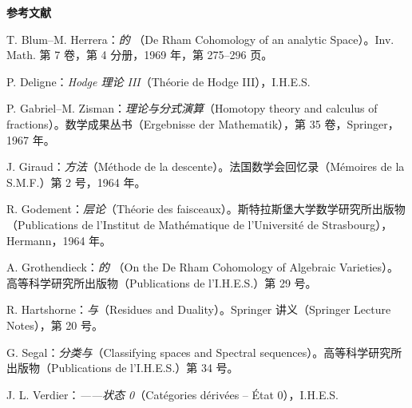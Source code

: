 \textbf{参考文献}
\begin{enumerate}[label={[\arabic*]}]
\item T. Blum--M. Herrera：\emph{的 }（De Rham Cohomology of an analytic Space）。Inv. Math. 第 7 卷，第 4 分册，1969 年，第 275--296 页。
\item P. Deligne：\emph{Hodge 理论 III}（Théorie de Hodge III），I.H.E.S.
\item P. Gabriel--M. Zisman：\emph{理论与分式演算}（Homotopy theory and calculus of fractions）。数学成果丛书（Ergebnisse der Mathematik），第 35 卷，Springer，1967 年。
\item J. Giraud：\emph{方法}（Méthode de la descente）。法国数学会回忆录（Mémoires de la S.M.F.）第 2 号，1964 年。
\item R. Godement：\emph{层论}（Théorie des faisceaux）。斯特拉斯堡大学数学研究所出版物（Publications de l'Institut de Mathématique de l'Université de Strasbourg），Hermann，1964 年。
\item A. Grothendieck：\emph{的 }（On the De Rham Cohomology of Algebraic Varieties）。高等科学研究所出版物（Publications de l'I.H.E.S.）第 29 号。
\item R. Hartshorne：\emph{与}（Residues and Duality）。Springer 讲义（Springer Lecture Notes），第 20 号。
\item G. Segal：\emph{分类与}（Classifying spaces and Spectral sequences）。高等科学研究所出版物（Publications de l'I.H.E.S.）第 34 号。
\item J. L. Verdier：\emph{——状态 0}（Catégories dérivées -- État 0），I.H.E.S.
\end{enumerate}
